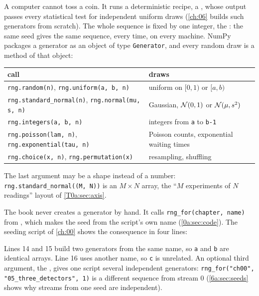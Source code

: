 A computer cannot toss a coin. It runs a deterministic recipe, a , whose output passes every statistical test for independent uniform draws (\cref{ch:06} builds such generators from scratch). The whole sequence is fixed by one integer, the : the same seed gives the same sequence, every time, on every machine. NumPy packages a generator as an object of type \texttt{Generator}, and every random draw is a method of that object:
\begin{center}
\small
\begin{tabular}{@{}ll@{}}
\toprule
call & draws \\
\midrule
\texttt{rng.random(n)}, \texttt{rng.uniform(a, b, n)} & uniform on $[0,1)$ or $[a,b)$\\
\texttt{rng.standard\_normal(n)}, \texttt{rng.normal(mu, s, n)} & Gaussian, $\mathcal{N}(0,1)$ or $\mathcal{N}(\mu,s^2)$\\
\texttt{rng.integers(a, b, n)} & integers from \texttt{a} to \texttt{b-1}\\
\texttt{rng.poisson(lam, n)}, \texttt{rng.exponential(tau, n)} & Poisson counts, exponential waiting times\\
\texttt{rng.choice(x, n)}, \texttt{rng.permutation(x)} & resampling, shuffling\\
\bottomrule
\end{tabular}
\end{center}
The last argument may be a shape instead of a number: \texttt{rng.standard\_normal((M, N))} is an $M\times N$ array, the ``$M$ experiments of $N$ readings'' layout of \cref{T0a:sec:axis}.

The book never creates a generator by hand. It calls \texttt{rng\_for(chapter, name)} from , which makes the seed from the script's own name (\cref{0a:sec:code}). The seeding script of \cref{ch:00} shows the consequence in four lines:


Lines 14 and 15 build two generators from the same name, so \texttt{a} and \texttt{b} are identical arrays. Line 16 uses another name, so \texttt{c} is unrelated. An optional third argument, the , gives one script several independent generators: \texttt{rng\_for("ch00", "05\_three\_detectors", 1)} is a different sequence from stream $0$ (\cref{6a:sec:seeds} shows why streams from one seed are independent).

